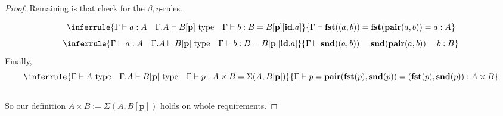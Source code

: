 \documentclass[12pt, letterpaper]{amsart}
\theoremstyle{definition}
\theoremstyle{remark}
\theoremstyle{plain}
\numberwithin{equation}{section}
\begin{document}
\begin{proof}
Remaining is that check for the $\beta, \eta$-rules. 

\[
\inferrule
{
    \Gamma \vdash a : A \quad \Gamma.A \vdash B[\mathbf{p}] \text{ type} \quad \Gamma \vdash b : B = B[\mathbf{p}][\mathbf{id}.a]
}
{
    \Gamma \vdash \mathbf{fst}((a, b)) = \mathbf{fst}(\mathbf{pair}(a,  b)) = a : A
}
\]
\[
\inferrule
{
    \Gamma \vdash a : A \quad \Gamma.A \vdash B[\mathbf{p}] \text{ type} \quad \Gamma \vdash b : B = B[\mathbf{p}][\mathbf{id}.a]
}
{
    \Gamma \vdash \mathbf{snd}((a, b)) = \mathbf{snd}(\mathbf{pair}(a,  b)) = b : B
}
\]
Finally, 
\[
\inferrule
{
    \Gamma \vdash A \text{ type} \quad \Gamma.A \vdash B[\mathbf{p}] \text{ type} \quad \Gamma \vdash p : A \times B = \Sigma(A, B[\mathbf{p}])
}
{
    \Gamma \vdash p = \mathbf{pair}(\mathbf{fst}(p), \mathbf{snd}(p)) = (\mathbf{fst}(p), \mathbf{snd}(p)) : A \times B 
}
\]
\\ 
So our definition $A \times B := \Sigma(A, B[\mathbf{p}])$ holds on whole requirements. 

\end{proof}

\newpage 
\end{document}

